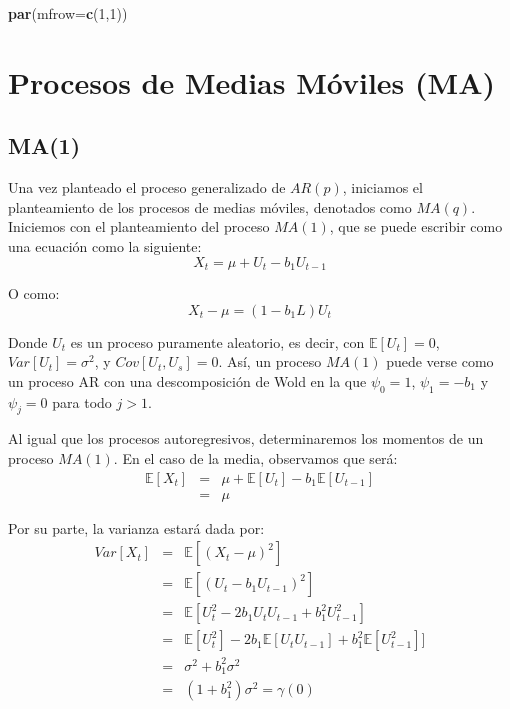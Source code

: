 \documentclass[
]{book}
\newenvironment{Shaded}{\begin{snugshade}}{\end{snugshade}}
\newcommand{\AttributeTok}[1]{\textcolor[rgb]{0.13,0.29,0.53}{#1}}
\newcommand{\DecValTok}[1]{\textcolor[rgb]{0.00,0.00,0.81}{#1}}
\newcommand{\FunctionTok}[1]{\textcolor[rgb]{0.13,0.29,0.53}{\textbf{#1}}}
\newcommand{\NormalTok}[1]{#1}
\begin{document}
\begin{Shaded}
\begin{Highlighting}[]
\FunctionTok{par}\NormalTok{(}\AttributeTok{mfrow=}\FunctionTok{c}\NormalTok{(}\DecValTok{1}\NormalTok{,}\DecValTok{1}\NormalTok{))}
\end{Highlighting}
\end{Shaded}

\hypertarget{procesos-de-medias-muxf3viles-ma}{%
\section{Procesos de Medias Móviles (MA)}\label{procesos-de-medias-muxf3viles-ma}}

\hypertarget{ma1}{%
\subsection{MA(1)}\label{ma1}}

Una vez planteado el proceso generalizado de \(AR(p)\), iniciamos el planteamiento de los procesos de medias móviles, denotados como \(MA(q)\). Iniciemos con el planteamiento del proceso \(MA(1)\), que se puede escribir como una ecuación como la siguiente:
\begin{equation}
    X_t = \mu + U_t - b_1 U_{t-1}
    \label{eq:MA1Eq}
\end{equation}

O como:
\begin{equation}
    X_t - \mu = (1 - b_1 L) U_{t}
\end{equation}

Donde \(U_t\) es un proceso puramente aleatorio, es decir, con \(\mathbb{E}[U_t] = 0\), \(Var[U_t] = \sigma^2\), y \(Cov[U_t, U_s] = 0\). Así, un proceso \(MA(1)\) puede verse como un proceso AR con una descomposición de Wold en la que \(\psi_0 = 1\), \(\psi_1 = - b_1\) y \(\psi_j = 0\) para todo \(j > 1\).

Al igual que los procesos autoregresivos, determinaremos los momentos de un proceso \(MA(1)\). En el caso de la media, observamos que será:
\begin{eqnarray}
    \mathbb{E}[X_t] & = & \mu + \mathbb{E}[U_t] - b_1 \mathbb{E}[U_{t - 1}] \nonumber \\
    & = & \mu
\end{eqnarray}

Por su parte, la varianza estará dada por:
\begin{eqnarray}
    Var[X_t] & = & \mathbb{E}[(X_t - \mu)^2] \nonumber \\
    & = & \mathbb{E}[(U_t - b_1 U_{t-1})^2] \nonumber \\
    & = & \mathbb{E}[U_t^2 - 2 b_1 U_t U_{t-1} + b_1^2 U_{t - 1}^2] \nonumber \\
    & = &\mathbb{E}[U_t^2] - 2 b_1 \mathbb{E}[U_t U_{t-1}] + b_1^2 \mathbb{E}[U_{t - 1}^2]] \nonumber \\
    & = & \sigma^2 + b_1^2 \sigma^2 \nonumber \\
    & = & (1 + b_1^2) \sigma^2 = \gamma(0)
\end{eqnarray}
\end{document}
